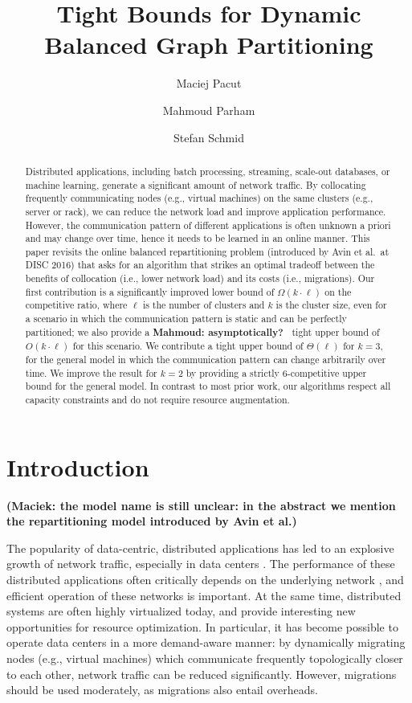 \documentclass[a4paper,anonymous,USenglish]{lipics-v2019}
\title{Tight Bounds for Dynamic Balanced Graph Partitioning}
\author{Maciej Pacut}{maciej.pacut@univie.ac.at}{Faculty of Computer Science, University of Vienna,Austria}{0000-0002-6379-1490}{}
\author{Mahmoud Parham}{mahmoud.parham@univie.ac.at}{Faculty of Computer Science, University of Vienna, Austria}{0000-0002-6211-077X}{}
\author{Stefan Schmid}{stefan\_schmid@univie.ac.at}{Faculty of Computer Science, University of Vienna, Austria}{}{}
\newcommand\mahmoud[1]{\color{orange}\textbf{Mahmoud: #1~}\color{black}}
\newcommand\maciek[1]{\color{brown}\textbf{(Maciek: #1)}\color{black}}
\begin{document}
\begin{abstract}
	Distributed   applications,  including  batch  processing, streaming, scale-out databases,
	or machine learning, generate a significant amount of network traffic.
	By collocating frequently communicating nodes (e.g., virtual machines) on the same clusters (e.g., server or rack), we can reduce the network load and  improve application performance. 
	However, the communication pattern of different applications is often unknown a priori and may change over time, hence it needs to be learned in an online manner.
	This paper revisits the online 
	balanced repartitioning problem 
	(introduced by Avin et al.~at DISC 2016)
	that asks for an algorithm that strikes
	an optimal tradeoff between the benefits
	of collocation (i.e., lower network load) 
	and its costs (i.e., migrations). 
	Our first contribution is a significantly improved
	lower bound of $\Omega(k\cdot \ell)$ on the
	competitive ratio, where $\ell$ is the number
	of clusters and $k$ is the cluster size,
	even for a scenario in which the communication
	pattern is static and can be perfectly partitioned;
	we also provide a \mahmoud{asymptotically?} tight upper bound 
	of $O(k\cdot \ell)$ for this scenario.
	We contribute a tight upper bound
	of $\Theta(\ell)$ for $k=3$,
	for the general model in which the
	communication pattern can change arbitrarily
	over time.
	We improve the result for $k=2$ by providing a strictly $6$-competitive upper bound for the general model.
	In contrast to most prior work, our algorithms respect all capacity constraints and do not require resource augmentation.
	
\end{abstract}

\maketitle



\section{Introduction}

\maciek{the model name is still unclear: in the abstract we mention the repartitioning model introduced by Avin et al.}

The popularity of data-centric, distributed applications has led to an explosive growth of network traffic, especially in data centers \cite{roy2015inside,singh2015jupiter}.
The performance of these distributed applications often critically depends on the underlying network \cite{mogul2012we}, and efficient operation of these networks is important.
At the same time, distributed systems are often highly virtualized today, and provide interesting new opportunities for resource optimization.
In particular, it has become possible to operate data centers in a more demand-aware manner: 
by dynamically migrating nodes (e.g., virtual machines) which communicate frequently topologically closer to each other, network traffic can be reduced significantly.  
However, migrations should be used moderately, as migrations also entail overheads. 
\end{document}
